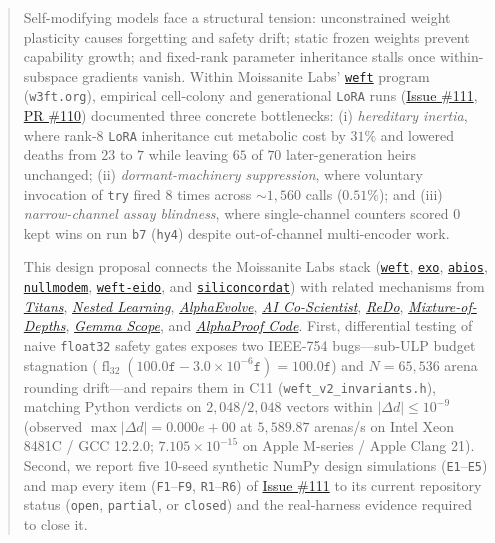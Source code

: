 \documentclass[10pt,a4paper]{article}
\begin{document}
\begin{abstract}
\noindent Self-modifying models face a structural tension: unconstrained weight plasticity causes forgetting and safety drift; static frozen weights prevent capability growth; and fixed-rank parameter inheritance stalls once within-subspace gradients vanish. Within Moissanite Labs' \href{https://github.com/Moissanite-Labs/weft}{\texttt{weft}} program (\texttt{w3ft.org}), empirical cell-colony and generational \texttt{LoRA} runs (\href{https://github.com/Moissanite-Labs/weft/issues/111}{Issue \#111}, \href{https://github.com/Moissanite-Labs/weft/pull/110}{PR \#110}) documented three concrete bottlenecks: (i) \emph{hereditary inertia}, where rank-8 \texttt{LoRA} inheritance cut metabolic cost by $31\%$ and lowered deaths from $23$ to $7$ while leaving $65$ of $70$ later-generation heirs unchanged; (ii) \emph{dormant-machinery suppression}, where voluntary invocation of \texttt{try} fired $8$ times across $\sim 1{,}560$ calls ($0.51\%$); and (iii) \emph{narrow-channel assay blindness}, where single-channel counters scored $0$ kept wins on run \texttt{b7} (\texttt{hy4}) despite out-of-channel multi-encoder work.

This design proposal connects the Moissanite Labs stack (\href{https://github.com/Moissanite-Labs/weft}{\texttt{weft}}, \href{https://github.com/Moissanite-Labs/exo}{\texttt{exo}}, \href{https://github.com/Moissanite-Labs/abios}{\texttt{abios}}, \href{https://github.com/Moissanite-Labs/nullmodem}{\texttt{nullmodem}}, \href{https://github.com/Moissanite-Labs/weft-eido}{\texttt{weft-eido}}, and \href{https://github.com/Moissanite-Labs/siliconcordat}{\texttt{siliconcordat}}) with related mechanisms from \href{https://arxiv.org/abs/2501.00663}{\emph{Titans}}, \href{https://arxiv.org/abs/2512.24695}{\emph{Nested Learning}}, \href{https://arxiv.org/abs/2506.13131}{\emph{AlphaEvolve}}, \href{https://research.google/blog/accelerating-scientific-breakthroughs-with-an-ai-co-scientist/}{\emph{AI Co-Scientist}}, \href{https://arxiv.org/abs/2302.12902}{\emph{ReDo}}, \href{https://arxiv.org/abs/2404.02258}{\emph{Mixture-of-Depths}}, \href{https://arxiv.org/abs/2408.05147}{\emph{Gemma Scope}}, and \href{https://deepmind.google/blog/introducing-alphaproof-code/}{\emph{AlphaProof Code}}. First, differential testing of naive \texttt{float32} safety gates exposes two IEEE-754 bugs---sub-ULP budget stagnation ($\operatorname{fl}_{32}(100.0\texttt{f} - 3.0\times 10^{-6}\texttt{f}) = 100.0\texttt{f}$) and $N=65{,}536$ arena rounding drift---and repairs them in C11 (\texttt{weft\_v2\_invariants.h}), matching Python verdicts on $2{,}048/2{,}048$ vectors within $|\Delta d| \le 10^{-9}$ (observed $\max |\Delta d| = 0.000e+00$ at $5,589.87$ arenas/s on Intel Xeon 8481C / GCC 12.2.0; $7.105 \times 10^{-15}$ on Apple M-series / Apple Clang 21). Second, we report five 10-seed synthetic NumPy design simulations (\texttt{E1}--\texttt{E5}) and map every item (\texttt{F1}--\texttt{F9}, \texttt{R1}--\texttt{R6}) of \href{https://github.com/Moissanite-Labs/weft/issues/111}{Issue \#111} to its current repository status (\texttt{open}, \texttt{partial}, or \texttt{closed}) and the real-harness evidence required to close it.
\end{abstract}
\end{document}

